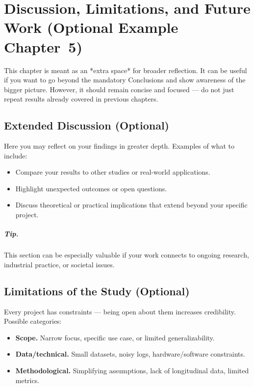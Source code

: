 \chapter{Discussion, Limitations, and Future Work (Optional Example Chapter~5)}
\label{chap:optional-discussion}


This chapter is meant as an *extra space* for broader reflection.  
It can be useful if you want to go beyond the mandatory Conclusions and show awareness of the bigger picture.  
However, it should remain concise and focused — do not just repeat results already covered in previous chapters.

\section{Extended Discussion (Optional)}
\label{sec:extended-discussion}
Here you may reflect on your findings in greater depth.  
Examples of what to include:

\begin{itemize}[leftmargin=1.2cm]
  \item Compare your results to other studies or real-world applications.  
  \item Highlight unexpected outcomes or open questions.  
  \item Discuss theoretical or practical implications that extend beyond your specific project.  
\end{itemize}

\paragraph{Tip.} This section can be especially valuable if your work connects to ongoing research, industrial practice, or societal issues.

\section{Limitations of the Study (Optional)}
\label{sec:limitations}
Every project has constraints — being open about them increases credibility.  
Possible categories:

\begin{itemize}[leftmargin=1.2cm]
  \item \textbf{Scope.} Narrow focus, specific use case, or limited generalizability.  
  \item \textbf{Data/technical.} Small datasets, noisy logs, hardware/software constraints.  
  \item \textbf{Methodological.} Simplifying assumptions, lack of longitudinal data, limited metrics.  
\end{itemize}

